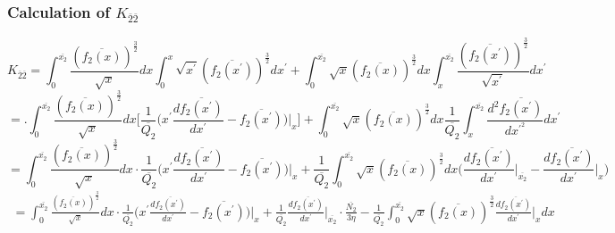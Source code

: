 \documentclass[fleqn, 10pt]{article}
\begin{document}
            \subsubsection{Calculation of $K_{\overline{2}\overline{2}}$}
            \begin{equation}
            K_{\overline{2}\overline{2}} = \int^{\overline{x_{2}}}_{0} \frac{(\overline{f_{2}(x)})^\frac{3}{2}}{\sqrt{x}}dx \int^{x}_{0} \sqrt{x^\prime}(\overline{f_{2}(x^\prime)})^\frac{3}{2}dx^{\prime} + \int^{\overline{x_{2}}}_{0} \sqrt{x} (\overline{f_{2}(x)})^\frac{3}{2}dx \int^{\overline{x_{2}}}_{x} \frac{(\overline{f_{2}(x^\prime)})^\frac{3}{2}}{\sqrt{x^\prime}} dx^\prime
            \end{equation}
            \begin{equation*}
            = \biggl. \int^{\overline{x_{2}}}_{0} \frac{(\overline{f_{2}(x)})^\frac{3}{2}}{\sqrt{x}} dx \biggl[ \frac{1}{\overline{Q_{2}}}\biggl(x^\prime \frac{d\overline{f_{2}(x^\prime)}}{dx^{\prime}} - \overline{f_{2}(x^\prime)} \biggr)\biggr|_{x}\biggr] + \int^{\overline{x_{2}}}_{0}\sqrt{x} (\overline{f_{2}(x)})^\frac{3}{2} dx \frac{1}{\overline{Q_{2}}} \int^{\overline{x_{2}}}_{x} \frac{d^{2}\overline{f_{2}(x^\prime)}}{dx^{\prime^2}}dx^{\prime}
            \end{equation*}
            \begin{equation*}
            = \int^{\overline{x_{2}}}_{0} \frac{(\overline{f_{2}(x)})^\frac{3}{2}}{\sqrt{x}}dx \cdot \frac{1}{\overline{Q_{2}}}\biggl( x^\prime\frac{d\overline{f_{2}(x^\prime)}}{dx^\prime} - \overline{f_{2}(x^\prime)}   \biggr) \Bigg|_{x}+ \frac{1}{\overline{Q_{2}}} \int^{\overline{x_{2}}}_{0} \sqrt{x} (\overline{f_{2}(x)})^\frac{3}{2} dx \biggl( \frac{d\overline{f_{2}(x^\prime)}}{dx^\prime}\biggr|_{\overline{x_{2}}} - \frac{d\overline{f_{2}(x^\prime)}}{dx^{\prime}}\biggr|_{x}\biggr)
            \end{equation*}
            \begin{equation*}
            \begin{split}
            = \int^{\overline{x_{2}}}_{0} \frac{(\overline{f_{2}(x)})^\frac{3}{2}}{\sqrt{x}} dx \cdot \frac{1}{\overline{Q_{2}}}\biggl( x^{\prime} \frac{d\overline{f_{2}(x^\prime)}}{dx^{\prime}} - \overline{f_{2}(x^\prime)}\biggr)\biggr|_{x} + \frac{1}{\overline{Q_{2}}} \frac{d\overline{f_{2}(x^\prime)}}{dx^{\prime}}\biggr|_{\overline{x_{2}}} \cdot\frac{\overline{N_{2}}}{3\eta}  - \frac{1}{\overline{Q_{2}}} \int^{\overline{x_{2}}}_{0} \sqrt{x} (\overline{f_{2}(x)})^\frac{3}{2} \frac{d\overline{f_{2}(x^\prime)}}{dx^{\prime}} \biggr|_{x} dx
            \end{split}
            \end{equation*}
\end{document}
